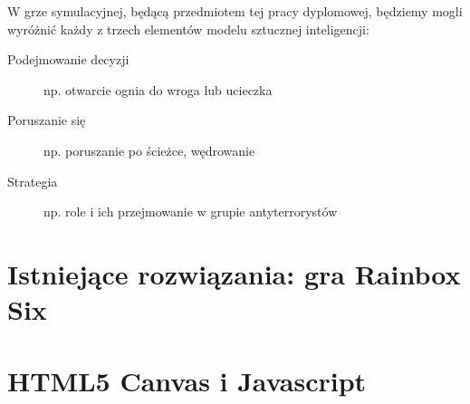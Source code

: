 W grze symulacyjnej, będącą przedmiotem tej pracy dyplomowej, będziemy mogli wyróżnić każdy z trzech elementów modelu sztucznej inteligencji:
\begin{description}
	\item[Podejmowanie decyzji] np. otwarcie ognia do wroga lub ucieczka
	\item[Poruszanie się] np. poruszanie po ścieżce, wędrowanie
	\item[Strategia] np. role i ich przejmowanie w grupie antyterrorystów
\end{description}

\section{Istniejące rozwiązania: gra Rainbox Six}


\section{HTML5 Canvas i Javascript}

